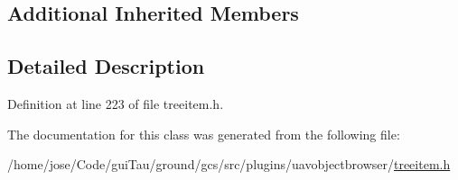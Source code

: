 \subsection*{Additional Inherited Members}


\subsection{Detailed Description}


Definition at line 223 of file treeitem.\-h.



The documentation for this class was generated from the following file\-:\begin{DoxyCompactItemize}
\item 
/home/jose/\-Code/gui\-Tau/ground/gcs/src/plugins/uavobjectbrowser/\hyperlink{treeitem_8h}{treeitem.\-h}\end{DoxyCompactItemize}
